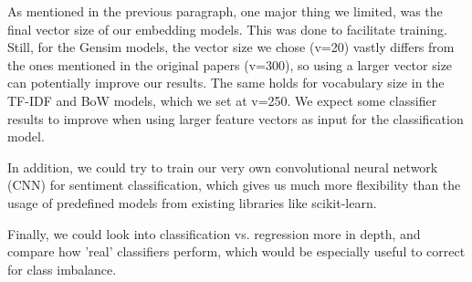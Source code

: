 As mentioned in the previous paragraph, one major thing we limited, was the final vector size of our embedding models. This was done to facilitate training. Still, for the Gensim models, the vector size we chose (v=20) vastly differs from the ones mentioned in the original papers (v=300), so using a larger vector size can potentially improve our results. The same holds for vocabulary size in the TF-IDF and BoW models, which we set at v=250. We expect some classifier results to improve when using larger feature vectors as input for the classification model.

In addition, we could try to train our very own convolutional neural network (CNN) for sentiment classification, which gives us much more flexibility than the usage of predefined models from existing libraries like scikit-learn.

Finally, we could look into classification vs. regression more in depth, and compare how 'real' classifiers perform, which would be especially useful to correct for class imbalance.

